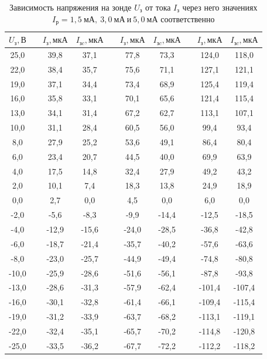 \documentclass[a4paper,10pt]{article}
\begin{document}
\begin{table}[h]
	\centering
	\caption{Зависимость напряжения на зонде $U_{\text{з}}$ от тока $I_{\text{з}}$ через него значениях $I_{\text{р}}=1,5~\text{мА},\ 3,0~\text{мА}\ \text{и}\ 5,0~\text{мА}$ соответственно} \label{Holl}
	\begin{tabular}{|c|c|c|c|c|c|c|c|c|c|}
		\hline
		$U_{\text{з}},\text{В}$ && $I_{\text{з}},\text{мкА}$ & $I_{\text{з}c},\text{мкА}$ && $I_{\text{з}},\text{мкА}$ & $I_{\text{з}c},\text{мкА}$ && $I_{\text{з}},\text{мкА}$ & $I_{\text{з}c},\text{мкА}$ \\ \hline
		25,0 && 39,8 & 37,1 && 77,8 & 73,3 && 124,0 & 118,0 \\ \hline
		22,0 && 38,4 & 35,7 && 75,6 & 71,1 && 127,1 & 121,1 \\ \hline
		19,0 && 37,1 & 34,4 && 73,4 & 68,9 && 125,4 & 119,4 \\ \hline
		16,0 && 35,8 & 33,1 && 70,1 & 65,6 && 121,4 & 115,4 \\ \hline
		13,0 && 34,1 & 31,4 && 67,2 & 62,7 && 113,1 & 107,1 \\ \hline
		10,0 && 31,1 & 28,4 && 60,5 & 56,0 && 99,4 & 93,4 \\ \hline
		8,0 && 27,9 & 25,2 && 53,6 & 49,1 && 86,4 & 80,4 \\ \hline
		6,0 && 23,4 & 20,7 && 44,5 & 40,0 && 69,9 & 63,9 \\ \hline
		4,0 && 17,5 & 14,8 && 32,4 & 27,9 && 49,2 & 43,2 \\ \hline
		2,0 && 10,1 & 7,4 && 18,3 & 13,8 && 24,9 & 18,9 \\ \hline
		0,0 && 2,7 & 0,0 && 4,5 & 0,0 && 6,0 & 0,0 \\ \hline
		-2,0 && -5,6 & -8,3 && -9,9 & -14,4 && -12,5 & -18,5 \\ \hline
		-4,0 && -12,9 & -15,6 && -24,0 & -28,5 && -36,8 & -42,8 \\ \hline
		-6,0 && -18,7 & -21,4 && -35,7 & -40,2 && -57,6 & -63,6 \\ \hline
		-8,0 && -23,0 & -25,7 && -44,9 & -49,4 && -74,8 & -80,8 \\ \hline
		-10,0 && -25,9 & -28,6 && -51,6 & -56,1 && -87,8 & -93,8 \\ \hline
		-13,0 && -28,6 & -31,3 && -57,9 & -62,4 && -101,4 & -107,4 \\ \hline
		-16,0 && -30,1 & -32,8 && -61,4 & -66,1 && -109,4 & -115,4 \\ \hline
		-19,0 && -31,2 & -33,9 && -63,7 & -68,2 && -113,1 & -119,1 \\ \hline
		-22,0 && -32,4 & -35,1 && -65,7 & -70,2 && -114,8 & -120,8 \\ \hline
		-25,0 && -33,5 & -36,2 && -67,7 & -72,2 && -112,2 & -118,2 \\ \hline
	\end{tabular}
\end{table}
\end{document}
